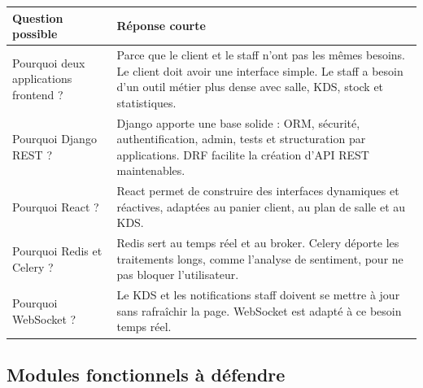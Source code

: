 \documentclass[10pt,a4paper]{article}
\begin{document}
\begin{tabularx}{\textwidth}{p{5cm}Y}
\toprule
\textbf{Question possible} & \textbf{Réponse courte} \\
\midrule
Pourquoi deux applications frontend ? & Parce que le client et le staff n'ont pas les mêmes besoins. Le client doit avoir une interface simple. Le staff a besoin d'un outil métier plus dense avec salle, KDS, stock et statistiques. \\
Pourquoi Django REST ? & Django apporte une base solide : ORM, sécurité, authentification, admin, tests et structuration par applications. DRF facilite la création d'API REST maintenables. \\
Pourquoi React ? & React permet de construire des interfaces dynamiques et réactives, adaptées au panier client, au plan de salle et au KDS. \\
Pourquoi Redis et Celery ? & Redis sert au temps réel et au broker. Celery déporte les traitements longs, comme l'analyse de sentiment, pour ne pas bloquer l'utilisateur. \\
Pourquoi WebSocket ? & Le KDS et les notifications staff doivent se mettre à jour sans rafraîchir la page. WebSocket est adapté à ce besoin temps réel. \\
\bottomrule
\end{tabularx}

\subsection{Modules fonctionnels à défendre}
\end{document}

